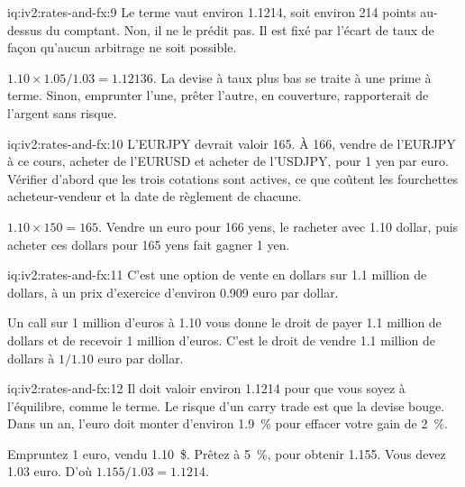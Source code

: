 \begin{solution}{iq:iv2:rates-and-fx:9}
Le terme vaut environ 1.1214, soit environ 214 points au-dessus du comptant. Non, il ne le prédit pas. Il est fixé par l'écart de taux de façon qu'aucun arbitrage ne soit possible.

$1.10 \times 1.05/1.03 = 1.12136$. La devise à taux plus bas se traite à une prime à terme. Sinon, emprunter l'une, prêter l'autre, en couverture, rapporterait de l'argent sans risque.

\end{solution}

\begin{solution}{iq:iv2:rates-and-fx:10}
L'EURJPY devrait valoir 165. À 166, vendre de l'EURJPY à ce cours, acheter de l'EURUSD et acheter de l'USDJPY, pour 1 yen par euro. Vérifier d'abord que les trois cotations sont actives, ce que coûtent les fourchettes acheteur-vendeur et la date de règlement de chacune.

$1.10 \times 150 = 165$. Vendre un euro pour 166 yens, le racheter avec 1.10 dollar, puis acheter ces dollars pour 165 yens fait gagner 1 yen.

\end{solution}

\begin{solution}{iq:iv2:rates-and-fx:11}
C'est une option de vente en dollars sur 1.1 million de dollars, à un prix d'exercice d'environ 0.909 euro par dollar.

Un call sur 1 million d'euros à 1.10 vous donne le droit de payer 1.1 million de dollars et de recevoir 1 million d'euros. C'est le droit de vendre 1.1 million de dollars à $1/1.10$ euro par dollar.

\end{solution}

\begin{solution}{iq:iv2:rates-and-fx:12}
Il doit valoir environ 1.1214 pour que vous soyez à l'équilibre, comme le terme. Le risque d'un carry trade est que la devise bouge. Dans un an, l'euro doit monter d'environ 1.9~\% pour effacer votre gain de 2~\%.

Empruntez 1 euro, vendu 1.10~\$. Prêtez à 5~\%, pour obtenir 1.155. Vous devez 1.03 euro. D'où $1.155/1.03 = 1.1214$.

\end{solution}

